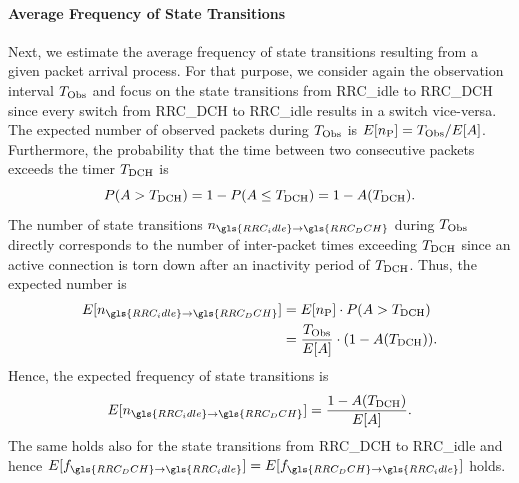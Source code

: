 \paragraph*{Average Frequency of State Transitions}

\newcommand{\NStateTransitionsIdleToDCH}{n_{\gls{RRC_idle}\rightarrow\gls{RRC_DCH}}\xspace}
\newcommand{\NStateTransitionsDCHToIdle}{n_{\gls{RRC_DCH}\rightarrow\gls{RRC_idle}}\xspace}
\newcommand{\fStateTransitionsIdleToDCH}{f_{\gls{RRC_idle}\rightarrow\gls{RRC_DCH}}\xspace}
\newcommand{\fStateTransitionsDCHToIdle}{f_{\gls{RRC_DCH}\rightarrow\gls{RRC_idle}}\xspace}

Next, we estimate the average frequency of state transitions resulting from a given packet arrival process.
For that purpose, we consider again the observation interval \(T_{\text{Obs}}\) and focus on the state transitions from \gls{RRC_idle} to \gls{RRC_DCH} since every switch from \gls{RRC_DCH} to \gls{RRC_idle} results in a switch vice-versa.
The expected number of observed packets during \(T_{\text{Obs}}\) is
\(E[n_{\text{P}}]=T_{\text{Obs}}/E[A]\).
Furthermore, the probability that the time between two consecutive packets exceeds the timer \(T_{\text{DCH}}\) is
\begin{equation}
P(A > T_{\text{DCH}}) = 1 - P(A \leq T_{\text{DCH}}) = 1 - A(T_{\text{DCH}}).
\end{equation}
The number of state transitions \(\NStateTransitionsIdleToDCH\) during \(T_{\text{Obs}}\) directly corresponds to the number of inter-packet times exceeding \(T_{\text{DCH}}\) since an active connection is torn down after an inactivity period of \(T_{\text{DCH}}\).
Thus, the expected number is
\begin{align*}
\begin{split}
E[\NStateTransitionsIdleToDCH] & = E[\NObservedPackets] \cdot P(\PacketIAT > \TDCH)\\
	& = \frac{\ObservationInterval}{E[\PacketIAT]}\cdot (1-\PacketIAT(\TDCH)).
\end{split}
\end{align*}
Hence, the expected frequency of state transitions is
\begin{equation*}
E[\NStateTransitionsIdleToDCH]=\frac{1-\PacketIAT(\TDCH)}{E[\PacketIAT]}.
\end{equation*}
The same holds also for the state transitions from \gls{RRC_DCH} to \gls{RRC_idle} and hence
\(E[\fStateTransitionsDCHToIdle]=E[\fStateTransitionsDCHToIdle]\)
holds.

